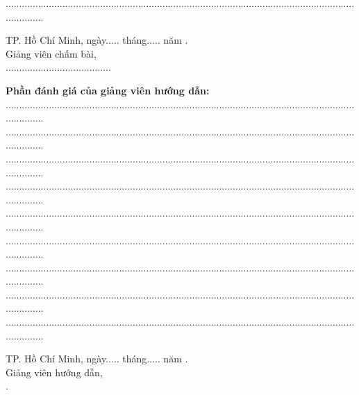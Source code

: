 	...............................................................................................................................................
\begin{center}
	\hspace*{5cm} TP. Hồ Chí Minh, ngày..... tháng..... năm \nam.\\
	\hspace*{5cm} Giảng viên chấm bài,\\
	\vspace*{1.2cm}
	\hspace*{5cm} .......................................
\end{center}
	\vspace*{0.5cm}
	\textbf{Phần đánh giá của giảng viên hướng dẫn:}\\
	...............................................................................................................................................\\
	...............................................................................................................................................\\
	...............................................................................................................................................\\
	...............................................................................................................................................\\
	...............................................................................................................................................\\
	...............................................................................................................................................\\
	...............................................................................................................................................\\
	...............................................................................................................................................\\
	...............................................................................................................................................
\begin{center}
	\hspace*{5cm} TP. Hồ Chí Minh, ngày..... tháng..... năm \nam.\\
	\hspace*{5cm} Giảng viên hướng dẫn,\\
	\vspace*{2cm}
	\hspace*{5cm} \gvhd.
\newpage
\end{center}
